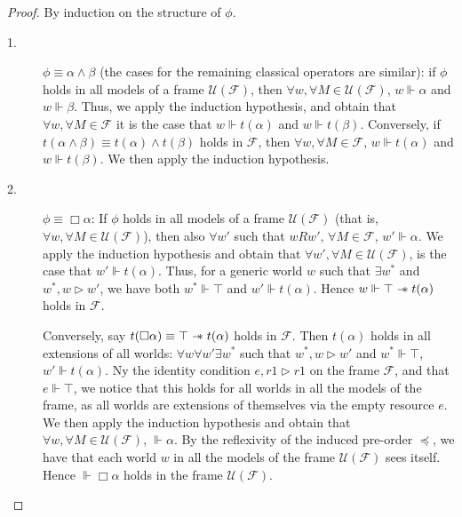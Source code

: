 \documentclass[a4paper]{article}
\newcommand\magicwand{\mathrel{-\mkern-6mu*}}
\begin{document}
\begin{proof}
By induction on the structure of $\phi$.

\begin{description}
    \item[1.] $\phi \equiv \alpha \land \beta$ (the cases for the remaining classical operators are similar): if $\phi$ holds in all models of a frame $\mathcal{U}(\mathcal{F})$, then $\forall w, \forall M \in \mathcal{U}(\mathcal{F})$, $w\Vdash \alpha$ and $w\Vdash \beta$. Thus, we apply the induction hypothesis, and obtain that $\forall w, \forall M \in \mathcal{F}$ it is the case that $w\Vdash t(\alpha)$ and $w\Vdash t(\beta)$. Conversely, if $t(\alpha \land \beta)\equiv t(\alpha)\land t(\beta)$ holds in $\mathcal{F}$, then $\forall w, \forall M \in \mathcal{F}$, $w\Vdash t(\alpha)$ and $w\Vdash t(\beta)$. We then apply the induction hypothesis.

\item[2.] $\phi \equiv \Box \alpha$: If $\phi$ holds in all models of a frame $\mathcal{U}(\mathcal{F})$ (that is, $\forall w, \forall M \in \mathcal{U}(\mathcal{F})$), then also $\forall w'$ such that $wRw'$, $\forall M \in \mathcal{F}$, $w'\Vdash \alpha$. We apply the induction hypothesis and obtain that $\forall w', \forall M \in \mathcal{U}(\mathcal{F})$, is the case that $w'\Vdash t(\alpha)$. Thus, for a generic world $w$ such that $\exists w^*$ and $w^*,w \triangleright w'$, we have both $w^*\Vdash \top$ and $w'\Vdash t(\alpha)$. Hence $w\Vdash \top \magicwand t(\alpha)$ holds in $\mathcal{F}$.

Conversely, say $t(\Box \alpha)\equiv \top \magicwand t(\alpha)$ holds in $\mathcal{F}$. Then $t(\alpha)$ holds in all extensions of all worlds: $\forall w \forall w' \exists w^*$ such that $w^*, w\triangleright w'$ and $w^*\Vdash \top$, $w'\Vdash t(\alpha)$. Ny the identity condition $e, r1 \triangleright r1$ on the frame $\mathcal{F}$, and that $e\Vdash \top$, we notice that this holds for all worlds in all the models of the frame, as all worlds are extensions of themselves via the empty resource $e$. We then apply the induction hypothesis and obtain that $\forall w, \forall M \in \mathcal{U}(\mathcal{F})$, $\Vdash \alpha$. By the reflexivity of the induced pre-order $\preceq$, we have that each world $w$ in all the models of the frame $\mathcal{U}(\mathcal{F})$ sees itself. Hence $\Vdash \Box \alpha$ holds in the frame $\mathcal{U}(\mathcal{F})$.
\end{description}    
\end{proof}
\end{document}
